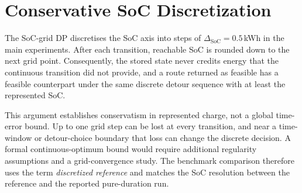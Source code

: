 \documentclass[review,3p,authoryear]{elsarticle}
\newcommand{\SoC}{\mathrm{SoC}}
\begin{document}
\section{Conservative SoC Discretization}
\label{app:eps_exact}

The SoC-grid DP discretises the SoC axis into steps of $\Delta_\SoC =
0.5$\,kWh in the main experiments.  After each transition, reachable SoC
is rounded down to the next grid point.  Consequently, the stored state
never credits energy that the continuous transition did not provide, and a
route returned as feasible has a feasible counterpart under the same
discrete detour sequence with at least the represented SoC.

This argument establishes conservatism in represented charge, not a global
time-error bound.  Up to one grid step can be lost at every transition, and
near a time-window or detour-choice boundary that loss can change the
discrete decision.  A formal continuous-optimum bound would require
additional regularity assumptions and a grid-convergence study.  The
benchmark comparison therefore uses the term \emph{discretized reference}
and matches the SoC resolution between the reference and the reported
pure-duration run.
\end{document}
